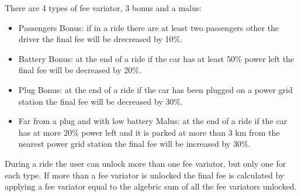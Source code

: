 \begin{description}
	There are 4 types of fee variator, 3 bonus and a malus:
	\begin{itemize}
		\item Passengers Bonus: if in a ride there are at least two passengers other the driver the final fee will be drecreased by 10\%.
		\item Battery Bonus: at the end of a ride if the car has at least 50\% power left the final fee will be decreased by 20\%.
		\item Plug Bonus: at the end of a ride if the car has been plugged on a power grid station the final fee will be decreased by 30\%.
		\item Far from a plug and with low battery Malus: at the end of a ride if the car has at more 20\% power left and it is parked at more than 3 km from the nearest power grid station the final fee will be increased by 30\%.
	\end{itemize}
	During a ride the user can unlock more than one fee variator, but only one for each type. If more than a fee variator is unlocked the final fee is calculated by applying a fee variator equal to the algebric sum of all the fee variators unlocked.
\end{description}
